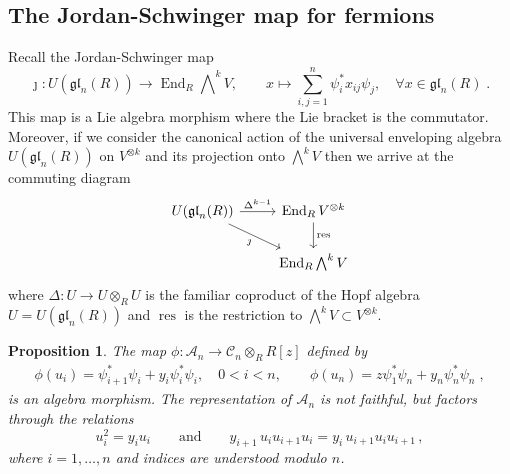 \documentclass[12pt]{amsart}
\newcommand{\End}{\operatorname{End}}
\newcommand{\mc}[1]{\mathcal{#1}}
\newcommand{\op}[1]{\operatorname{#1}}
\newcommand{\ring}{R}
\newtheorem{prop}{Proposition}[section]
\numberwithin{equation}{section}
\numberwithin{figure}{section}
\newcommand{\gl}{\mathfrak{gl}}
\begin{document}
    \subsection{The Jordan-Schwinger map for fermions}
     Recall the Jordan-Schwinger map
    \begin{equation}\label{jsmap}
\jmath:U(\gl_n(\ring))\to\End_{\ring}\bigwedge\nolimits^kV,\qquad x\mapsto \sum_{i,j=1}^n\psi^*_ix_{ij}\psi_j,\quad\forall x\in\gl_n(\ring)\;.
    \end{equation}
    This map is a Lie algebra morphism where the Lie bracket is the commutator. Moreover, if we consider the canonical action of the universal enveloping algebra $U(\gl_n(\ring))$ on $V^{\otimes k}$ and its projection onto $\bigwedge^kV$ then we arrive at the commuting diagram
    \[
  \begin{tikzcd}
    U(\gl_n(\ring)) \arrow{r}{\Delta^{k-1}} \arrow[swap]{dr}{\jmath} & \End_{\ring} V^{\otimes k} \arrow{d}{\op{res}} \\
     & \End_{\ring}\bigwedge\nolimits^kV
  \end{tikzcd}
\]
  where $\Delta:U\to U\otimes_\ring U$ is the familiar coproduct of the Hopf algebra $U=U(\gl_n(\ring))$ and $\op{res}$ is the restriction to $\bigwedge^kV\subset V^{\otimes k}$.
    \begin{prop} \label{propfermplac}
        The map $\phi: \mathcal{A}_n \to \mathcal{C}_n \otimes_\ring R[z]$ defined by
        \begin{gather}
        \phi(u_i) = \psi^*_{i + 1}\psi_i + y_{i} \psi^*_{i}\psi_{i}, \quad 0<i <n, \qquad
        \phi(u_{n}) = z \psi^*_{1}\psi_n + y_n \psi^*_n\psi_n\;,
        \end{gather}
        is an algebra morphism. The representation of $\mc{A}_n$ is not faithful, but factors through the relations
        \[
        u_i^2=y_iu_i\qquad\text{and}\qquad y_{i+1}\,u_iu_{i+1}u_i=y_i\,u_{i+1}u_iu_{i+1}\,,
        \]
        where $i=1,\ldots,n$ and indices are understood modulo $n$.
    \end{prop}
\end{document}
